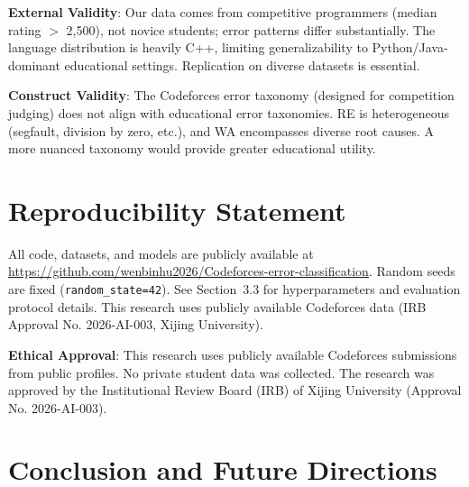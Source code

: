 \documentclass[10pt,letterpaper]{article}
\begin{document}
\textbf{External Validity}: Our data comes from competitive programmers (median rating $>$ 2,500), not novice students; error patterns differ substantially. The language distribution is heavily C++, limiting generalizability to Python/Java-dominant educational settings. Replication on diverse datasets is essential.

\textbf{Construct Validity}: The Codeforces error taxonomy (designed for competition judging) does not align with educational error taxonomies. RE is heterogeneous (segfault, division by zero, etc.), and WA encompasses diverse root causes. A more nuanced taxonomy would provide greater educational utility.

\section*{Reproducibility Statement}

\begin{sloppypar}\raggedright
All code, datasets, and models are publicly available at \url{https://github.com/wenbinhu2026/Codeforces-error-classification}. Random seeds are fixed (\texttt{random\_state=42}). See Section~3.3 for hyperparameters and evaluation protocol details. This research uses publicly available Codeforces data (IRB Approval No. 2026-AI-003, Xijing University).
\end{sloppypar}


\textbf{Ethical Approval}: This research uses publicly available Codeforces
submissions from public profiles. No private student data was collected.
The research was approved by the Institutional Review Board (IRB) of
Xijing University (Approval No. 2026-AI-003).

\section{Conclusion and Future Directions}
\end{document}
